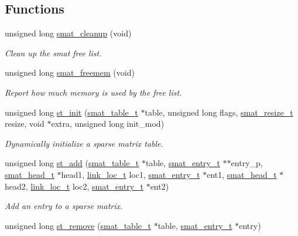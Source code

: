 \subsection*{Functions}
\begin{CompactItemize}
\item 
unsigned long \hyperlink{group__dbprim__smat_ga8}{smat\_\-cleanup} (void)
\begin{CompactList}\small\item\em Clean up the smat free list. \item\end{CompactList}\item 
unsigned long \hyperlink{group__dbprim__smat_ga9}{smat\_\-freemem} (void)
\begin{CompactList}\small\item\em Report how much memory is used by the free list. \item\end{CompactList}\item 
unsigned long \hyperlink{group__dbprim__smat_ga10}{st\_\-init} (\hyperlink{struct__smat__table__s}{smat\_\-table\_\-t} $\ast$table, unsigned long flags, \hyperlink{group__dbprim__smat_ga3}{smat\_\-resize\_\-t} resize, void $\ast$extra, unsigned long init\_\-mod)
\begin{CompactList}\small\item\em Dynamically initialize a sparse matrix table. \item\end{CompactList}\item 
unsigned long \hyperlink{group__dbprim__smat_ga11}{st\_\-add} (\hyperlink{struct__smat__table__s}{smat\_\-table\_\-t} $\ast$table, \hyperlink{struct__smat__entry__s}{smat\_\-entry\_\-t} $\ast$$\ast$entry\_\-p, \hyperlink{struct__smat__head__s}{smat\_\-head\_\-t} $\ast$head1, \hyperlink{group__dbprim__link_ga4}{link\_\-loc\_\-t} loc1, \hyperlink{struct__smat__entry__s}{smat\_\-entry\_\-t} $\ast$ent1, \hyperlink{struct__smat__head__s}{smat\_\-head\_\-t} $\ast$head2, \hyperlink{group__dbprim__link_ga4}{link\_\-loc\_\-t} loc2, \hyperlink{struct__smat__entry__s}{smat\_\-entry\_\-t} $\ast$ent2)
\begin{CompactList}\small\item\em Add an entry to a sparse matrix. \item\end{CompactList}\item 
unsigned long \hyperlink{group__dbprim__smat_ga12}{st\_\-remove} (\hyperlink{struct__smat__table__s}{smat\_\-table\_\-t} $\ast$table, \hyperlink{struct__smat__entry__s}{smat\_\-entry\_\-t} $\ast$entry)
$$
\end{CompactItemize}
